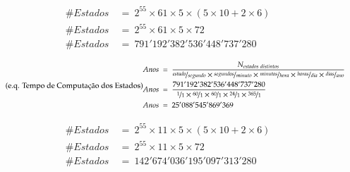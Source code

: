 \begin{equation} \label{eq_estados} \tag{e.q. Caso Geral}
\begin{split}
\#Estados\ &=\ 2^{55}\times 61\times 5\times (5\times 10 + 2\times 6)\\
\#Estados\ &=\ 2^{55}\times 61\times 5\times 72\\
\#Estados\ &=\ 791'192'382'536'448'737'280
\end{split}
\end{equation}

\begin{equation} \label{eq_anos_estados} \tag{e.q. Tempo de Computação dos Estados}
\begin{split}
Anos\ &=\ \dfrac{N_{estados\ distintos}}{\nicefrac{estado}{segundo}\times\nicefrac{segundos}{minuto}\times\nicefrac{minutos}{hora}\times\nicefrac{horas}{dia}\times\nicefrac{dias}{ano}}\\
Anos\ &=\ \dfrac{791'192'382'536'448'737'280}{\nicefrac{1}{1}\times\nicefrac{60}{1}\times\nicefrac{60}{1}\times\nicefrac{24}{1}\times\nicefrac{365}{1}}\\
Anos\ &=\ 25'088'545'869'369\\
\end{split}
\end{equation}

\begin{equation} \label{eq_poda1} \tag{e.q. Poda 1}
\begin{split}
\#Estados\ &=\ 2^{55}\times 11\times 5\times (5\times 10 + 2\times 6)\\
\#Estados\ &=\ 2^{55}\times 11\times 5\times 72\\
\#Estados\ &=\ 142'674'036'195'097'313'280
\end{split}
\end{equation}
